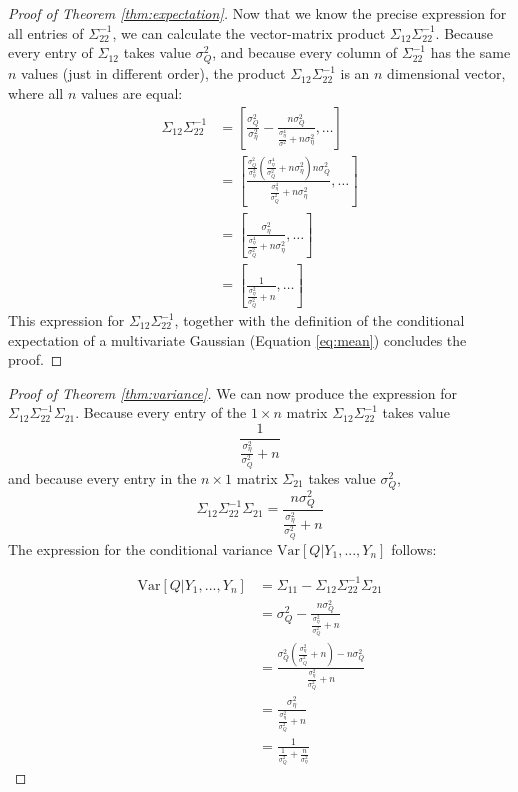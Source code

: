 \begin{proof}[Proof of Theorem \ref{thm:expectation}]
Now that we know the precise expression for all entries of $\Sigma_{22}^{-1}$,
we can calculate the vector-matrix product 
$\Sigma_{12} \Sigma_{22}^{-1}$.
Because every entry of $\Sigma_{12}$
takes value $\sigma_Q^2$, and because 
every column of $\Sigma_{22}^{-1}$ has the same $n$ values (just in different order),
the product $\Sigma_{12} \Sigma_{22}^{-1}$
is an $n$ dimensional vector, where
all $n$ values are equal:
\begin{align}
\Sigma_{12} \Sigma_{22}^{-1} & = 
\left[
\frac{\sigma_Q^2}{\sigma_\eta^2}
- \frac{n \sigma_Q^2}{
\frac{\sigma_\eta^4}{\sigma^2} + n \sigma_\eta^2
},
\dots
\right] \nonumber \\
 & = \left[
    \frac{\frac{\sigma_Q^2}{\sigma_\eta^2}
    \left(
    \frac{\sigma_\eta^4}{\sigma_Q^2} + n \sigma_\eta^2 \right) n\sigma_Q^2
    }
    {\frac{\sigma_\eta^4}{\sigma_Q^2} + n \sigma_\eta^2},
\dots
\right]\nonumber \\
 & = \left[
    \frac{\sigma_\eta^2 }
    {\frac{\sigma_\eta^4}{\sigma_Q^2} + n \sigma_\eta^2},
\dots
\right] \nonumber \\
 & = \left[
    \frac{1}
    {\frac{\sigma_\eta^2}{\sigma_Q^2} + n },
\dots
\right]  \label{eq:quality-mean}
\end{align}
This expression for $\Sigma_{12}\Sigma_{22}^{-1}$,
together with the definition of the conditional expectation 
of a multivariate Gaussian (Equation \ref{eq:mean}) concludes the proof.

\end{proof}


\begin{proof}[Proof of Theorem \ref{thm:variance}]

We can now produce the expression for 
$\Sigma_{12} \Sigma_{22}^{-1} \Sigma_{21}$.
Because every entry of the $1 \times n$ matrix $\Sigma_{12} \Sigma_{22}^{-1}$
takes value
$$\frac{1}{\frac{\sigma_\eta^2}{\sigma_Q^2} + n }$$
and because every entry in the $n \times 1$ matrix $\Sigma_{21}$
takes value $\sigma_Q^2$, 
\begin{equation}
\Sigma_{12} \Sigma_{22}^{-1} \Sigma_{21} =
\frac{n \sigma_Q^2}{\frac{\sigma_\eta^2}{\sigma_Q^2} + n }
\end{equation}
The expression for the conditional variance
$\text{Var}[Q|Y_1,...,Y_n]$ follows:

\begin{align}
\text{Var}[Q|Y_1,...,Y_n] & = \Sigma_{11} - \Sigma_{12} \Sigma_{22}^{-1} \Sigma_{21} \nonumber \\ 
&=
\sigma_Q^2 - \frac{n \sigma_Q^2}{\frac{\sigma_\eta^2}{\sigma_Q^2} + n }
\nonumber \\
%
& = 
\frac{\sigma_Q^2 \left( \frac{\sigma_\eta^2}{\sigma_Q^2} + n \right) 
- n \sigma_Q^2}{
\frac{\sigma_\eta^2}{\sigma_Q^2} + n
} \nonumber \\
& = 
\frac{\sigma_\eta^2}{
\frac{\sigma_\eta^2}{\sigma_Q^2} + n
} \nonumber \\
& = 
\frac{1}{
\frac{1}{\sigma_Q^2} + \frac{n}{\sigma_\eta^2}
} \label{eq:quality-variance}
\end{align}
\end{proof}


